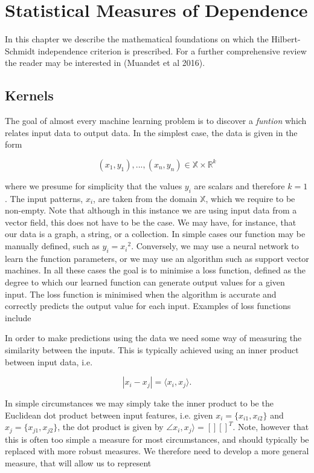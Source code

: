 \chapter{Statistical Measures of Dependence}
\label{hsic}

In this chapter we describe the mathematical foundations on which the Hilbert-Schmidt independence criterion is prescribed. For a further comprehensive review the reader may be interested in (Muandet et al 2016). 


\section{Kernels}

The goal of almost every machine learning problem is to discover a \textit{funtion} which relates input data to output data. In the simplest case, the data is given in the form 

\begin{equation}
(x_1, y_1), ..., (x_n, y_n) \in \mathbb{X} \times \mathbb{R}^k
\end{equation}

\noindent where we presume for simplicity that the values $y_i$ are scalars and therefore $k = 1$. The input patterns, $x_i$, are taken from the domain $\mathbb{X}$, which we require to be non-empty. Note that although in this instance we are using input data from a vector field, this does not have to be the case. We may have, for instance, that our data is a graph, a string, or a collection. In simple cases our function may be manually defined, such as $y_i = {x_i}^2$. Conversely, we may use a neural network to learn the function parameters, or we may use an algorithm such as support vector machines. In all these cases the goal is to minimise a {loss function}, defined as the degree to which our learned function can generate output values for a given input. The loss function is minimised when the algorithm is accurate and correctly predicts the output value for each input. Examples of loss functions include

In order to make predictions using the data we need some way of measuring the similarity between the inputs. This is typically achieved using an inner product between input data, i.e.

\begin {equation}
|x_i - x_j| = \langle x_i, x_j \rangle. 
\end {equation}

In simple circumstances we may simply take the inner product to be the Euclidean dot product between input features, i.e. given $x_i = \{ x_{i1}, x_{i2} \}$ and $x_j = \{ x_{j1}, x_{j2} \}$, the dot product is given by $ \angle x_i, x_j \rangle = [] []^T$. Note, however that this is often too simple a measure for most circumstances, and should typically be replaced with more robust measures. We therefore need to develop a more general measure, that will allow us to represent 

